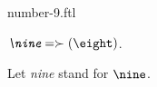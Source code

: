 \documentclass{stex}
\begin{document}
\begin{smodule}{number-9.ftl}



\begin{definition}[forthel,id=NineDef]
  $\emph{\nine} = \succ(\eight)$.

  Let \emph{nine} stand for $\nine$.
\end{definition}

\end{smodule}
\end{document}
